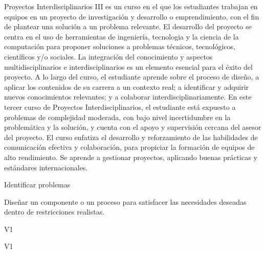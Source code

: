 \begin{syllabus}


\begin{justification}
Proyectos Interdisciplinarios III es un curso en el que los estudiantes trabajan en equipos en un proyecto de investigación y desarrollo o emprendimiento, con el fin de plantear una solución a un problema relevante. El desarrollo del proyecto se centra en el uso de herramientas de ingeniería, tecnologia y la ciencia de la computación para proponer soluciones a problemas técnicos, tecnológicos, científicos y/o sociales. La integración del
conocimiento y aspectos multidisciplinarios e interdisciplinarios es un elemento esencial para el éxito del proyecto. A lo largo del curso, el estudiante aprende sobre el proceso de
diseño, a aplicar los contenidos de su carrera a un contexto real; a identificar y adquirir nuevos conocimientos relevantes; y a colaborar interdisciplinariamente. En este tercer curso de Proyectos Interdisciplinarios, el estudiante está expuesto a problemas de complejidad moderada, con bajo nivel incertidumbre en la problemática y la solución, y cuenta con el
apoyo y supervisión cercana del asesor del proyecto. El curso enfatiza el desarrollo y reforzamiento de las habilidades de comunicación efectiva y colaboración, para propiciar la
formación de equipos de alto rendimiento. Se aprende a gestionar proyectos, aplicando buenas prácticas y estándares internacionales.
\end{justification}

\begin{goals}
   \item Identificar problemas
   \item Diseñar un componente o un proceso para satisfacer las necesidades deseadas dentro de restricciones realistas.  
\end{goals}

\begin{outcomes}{V1}
   \item {}
   \item {}
\end{outcomes}

\begin{competences}{V1}
    \item {}
    \item {}
\end{competences}


\end{syllabus}
